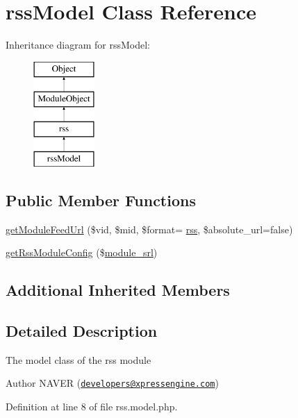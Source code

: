 \hypertarget{classrssModel}{}\section{rss\+Model Class Reference}
\label{classrssModel}
Inheritance diagram for rss\+Model\+:\begin{figure}[H]
\begin{center}
\leavevmode
\includegraphics[height=4.000000cm]{classrssModel}
\end{center}
\end{figure}
\subsection*{Public Member Functions}
\begin{DoxyCompactItemize}
\item 
\hyperlink{classrssModel_a2e188c3e11aab64655f3eb3d40b41ec3}{get\+Module\+Feed\+Url} (\$vid, \$mid, \$format= \textquotesingle{}\hyperlink{classrss}{rss}\textquotesingle{}, \$absolute\+\_\+url=false)
\item 
\hyperlink{classrssModel_a3c6f9fd398a931ff32038e2a48745bad}{get\+Rss\+Module\+Config} (\$\hyperlink{ko_8install_8php_a370bb6450fab1da3e0ed9f484a38b761}{module\+\_\+srl})
\end{DoxyCompactItemize}
\subsection*{Additional Inherited Members}


\subsection{Detailed Description}
The model class of the rss module

\begin{DoxyAuthor}{Author}
N\+A\+V\+ER (\href{mailto:developers@xpressengine.com}{\tt developers@xpressengine.\+com}) 
\end{DoxyAuthor}


Definition at line 8 of file rss.\+model.\+php.



